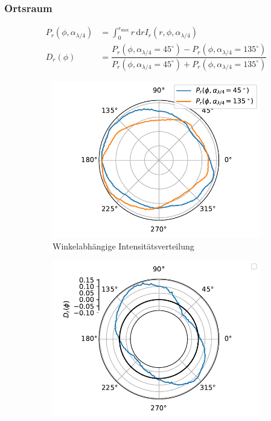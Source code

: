 \documentclass[a4paper, titlepage,  ngerman]{book}
\begin{document}
		\subsubsection{Ortsraum}
		\begin{align}
			\label{eq:integration_angular_int}
			P_r(\phi, \alpha_{\lambda/4}) &= \int_{0}^{r_\mathrm{max}}r\,\mathrm{d}r I_r(r, \phi, \alpha_{\lambda /4}) \\
			D_r(\phi) &= \dfrac{P_r(\phi, \alpha_{\lambda/4} = 45^\circ) - P_r(\phi, \alpha_{\lambda/4} = 135^\circ)}{P_r(\phi, \alpha_{\lambda/4} = 45^\circ) + P_r(\phi, \alpha_{\lambda/4} = 135^\circ)}
		\end{align}
		\begin{figure}		
			\begin{subfigure}{0.5\textwidth}
				\centering
				\includegraphics[width=\textwidth]{figures/new/4_7_fp_angular_distribution_45_135.pdf}
				\caption{Winkelabhängige Intensitätsverteilung}
				\label{fig:angular_int_fp}
			\end{subfigure}
			\hfill
			\begin{subfigure}{0.49\textwidth}
				\centering
				\includegraphics[width=\textwidth]{figures/new/4_7_fp_angular_distribution_diff_45_135.pdf}

\end{subfigure}
\end{figure}
\end{document}
